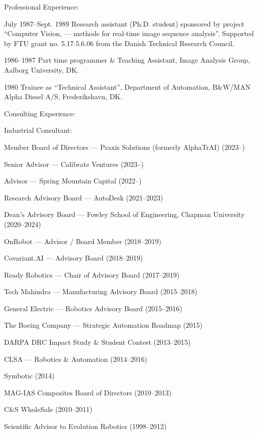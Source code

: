 \documentclass{article}
\newenvironment{sublist}{%
  \begin{list}{}{%
      \setlength{\itemsep}{0em}\setlength{\parsep}{0em}%
      \setlength{\topsep}{0em}\setlength{\parskip}{0em}%
    }%
}%
{ \end{list} }
\begin{document}
\begin{cv}
\begin{cvlist}{Professional Experience:}
\item[July 1987--Sept. 1989] Research assistant (Ph.D. student) sponsored
  by project ``Computer Vision, --- methods for real-time image
  sequence analysis''. Supported by FTU grant no. 5.17.5.6.06 from the
  Danish Technical Research Council.

\item[1986--1987] Part time programmer \& Teaching Assistant,
  Image Analysis Group, Aalborg University, DK.\@

\item[1980] Trainee as ``Technical Assistant'', Department of
  Automation, B\&W/MAN Alpha Diesel A/S, Frederikshavn, DK.\@
\end{cvlist}

\begin{cvlist}{Consulting Experience:}
\item Industrial Consultant:
\begin{sublist}
  \item Member Board of Directors --- Praxis Solutions (formerly AlphaTrAI) (2023--)
  \item Senior Advisor --- Calibrate Ventures (2023--)
  \item Advisor --- Spring Mountain Capital (2022--)
  \item Research Advisory Board --- AutoDesk (2021--2023)
  \item Dean's Advisory Board --- Fowley School of Engineering, Chapman University (2020--2024)
  \item OnRobot --- Advisor / Board Member (2018--2019)
  \item Covariant.AI --- Advisory Board (2018--2019)
  \item Ready Robotics --- Chair of Advisory Board (2017--2019)
  \item Tech Mahindra --- Manufacturing Advisory Board (2015--2018)
  \item General Electric --- Robotics Advisory Board (2015--2016)
  \item The Boeing Company --- Strategic Automation Roadmap (2015)
  \item DARPA DRC Impact Study \& Student Contest (2013--2015)
  \item CLSA --- Robotics \& Automation (2014--2016)
  \item Symbotic (2014)
  \item MAG-IAS Composites Board of Directors (2010--2013)
  \item C\&S WholeSale (2010--2011)
  \item Scientific Advisor to Evolution Robotics (1998--2012)

\end{sublist}
\end{cvlist}
\end{cv}
\end{document}
